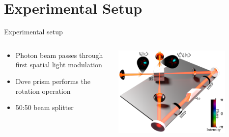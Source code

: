 \documentclass[aspectratio=169,9pt]{beamer}
\begin{document}
\section{Experimental Setup}
\begin{frame}[t]{Experimental setup}
  \begin{columns}[T]
    \begin{column}{0.4\textwidth}
      \begin{itemize}
        \item Photon beam passes through first spatial light modulation
        \item Dove prism performs the rotation operation
        \item 50:50 beam splitter
      \end{itemize}
    \end{column}
    \begin{column}{0.6\textwidth}
      \includegraphics[width=0.8\textwidth]{experimental_setup.png}\\
    \end{column}
  \end{columns}
\end{frame}
\end{document}
